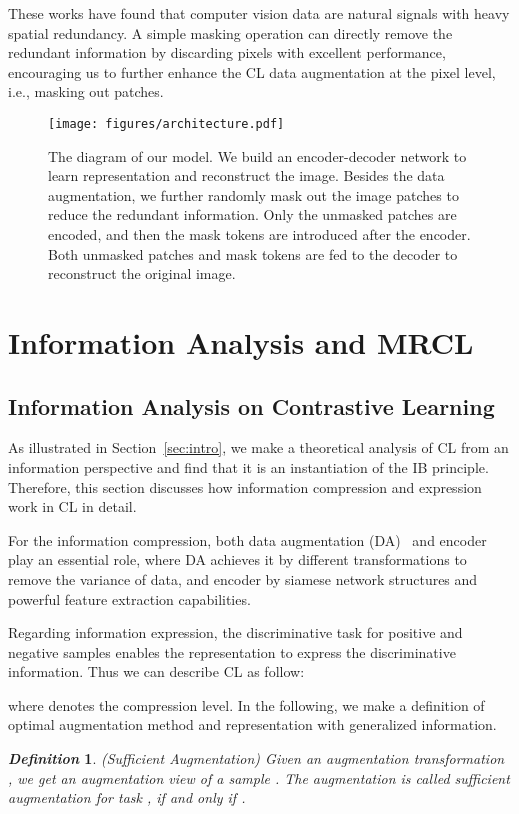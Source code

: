 \documentclass[10pt,twocolumn,letterpaper]{article}
\newtheorem{myDef}{\textit{Definition}}
\begin{document}
These works have found that computer vision data are natural signals with heavy spatial redundancy. A simple masking operation can directly remove the redundant information by discarding pixels with excellent performance, encouraging us to further enhance the CL data augmentation at the pixel level, i.e., masking out patches.

\begin{figure*}[ht!]
    \centering
    \texttt{[image: figures/architecture.pdf]}
    \caption{The diagram of our model. We build an encoder-decoder network to learn representation and reconstruct the image. Besides the data augmentation, we further randomly mask out the image patches to reduce the redundant information. Only the unmasked patches are encoded, and then the mask tokens are introduced after the encoder. Both unmasked patches and mask tokens are fed to the decoder to reconstruct the original image.} 
    \label{fig:architecture}
\end{figure*}
\section{Information Analysis and MRCL}
\subsection{Information Analysis on Contrastive Learning}
\label{sec:IBCL}
As illustrated in Section~\ref{sec:intro}, we make a theoretical analysis of CL from an information perspective and find that it is an instantiation of the IB principle. Therefore, this section discusses how information compression and expression work in CL in detail.

For the information compression, both data augmentation (DA)~ and encoder~ play an essential role, where DA achieves it by different transformations to remove the variance of data, and encoder by siamese network structures and powerful feature extraction capabilities.

Regarding information expression, the discriminative task  for positive and negative samples enables the representation to express the discriminative information. Thus we can describe CL as follow:

where  denotes the compression level. 
In the following, we make a definition of optimal augmentation method and representation with generalized information.

\begin{myDef}
(Sufficient Augmentation) Given an augmentation transformation , we get an augmentation view  of a sample . The augmentation  is called sufficient augmentation for task , if and only if .
\end{myDef}
\end{document}
